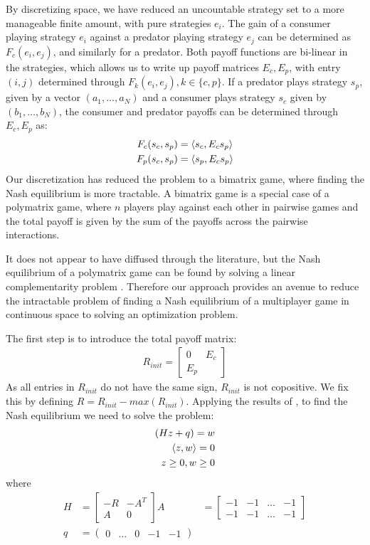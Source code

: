 By discretizing space, we have reduced an uncountable strategy set to a more manageable finite amount, with pure strategies $e_i$. The gain of a consumer playing strategy $e_i$ against a predator playing strategy $e_j$ can be determined as $F_c(e_i,e_j)$, and similarly for a predator. Both payoff functions are bi-linear in the strategies, which allows us to write up payoff matrices $E_c, E_p$, with entry $(i,j)$ determined through $F_k(e_i,e_j), k \in \{c, p\}$. If a predator plays strategy $s_p$, given by a vector $(a_1,\dots,a_N)$ and a consumer plays strategy $s_c$ given by $(b_1,\dots,b_N)$, the consumer and predator payoffs can be determined through $E_c,E_p$ as:
\begin{align}
  F_c(s_c,s_p)&=\left \langle s_c,E_c s_p \right \rangle \\
  F_p(s_c,s_p)&=\left \langle s_p,E_c s_p \right \rangle
\end{align}
Our discretization has reduced the problem to a bimatrix game, where finding the Nash equilibrium is more tractable. A bimatrix game is a special case of a polymatrix game, where $n$ players play against each other in pairwise games and the total payoff is given by the sum of the payoffs across the pairwise interactions.

It does not appear to have diffused through the literature, but the Nash equilibrium of a polymatrix game can be found by solving a linear complementarity problem \citep{miller1991copositive}. Therefore our approach provides an avenue to reduce the intractable problem of finding a Nash equilibrium of a multiplayer game in continuous space to solving an optimization problem.

The first step is to introduce the total payoff matrix:
\begin{align}
	R_{init} = \begin{bmatrix} 0 & E_c \\ E_p \end{bmatrix}
\end{align}
As all entries in $R_{init}$ do not have the same sign, $R_{init}$ is not copositive. We fix this by defining $R=R_{init}-max(R_{init})$.
Applying the results of \citep{miller1991copositive}, to find the Nash equilibrium we need to solve the problem:
\begin{align}
	(Hz+q) = w & \\
	\left \langle z,w \right \rangle = 0 & \\
	z\geq 0, w\geq 0
\end{align}
where
\begin{align}
  H &= \begin{bmatrix} -R & -A^T \\ A & 0 \end{bmatrix}
	A &= \begin{bmatrix} -1 &-1 & \dots & -1 \\  -1 &-1 & \dots & -1 \end{bmatrix} \\
	q &= \begin{pmatrix} 0 &\dots & 0 & -1 & -1 \end{pmatrix}   \\
\end{align}


